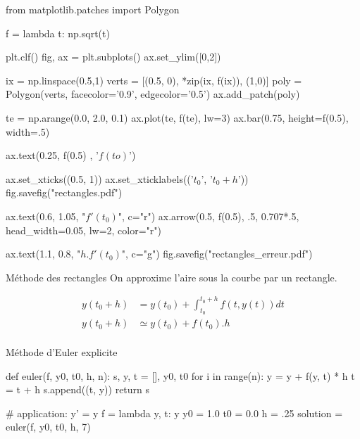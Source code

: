 \documentclass{beamer}
\begin{document}
\begin{pycode}
    from matplotlib.patches import Polygon

    f = lambda t: np.sqrt(t)

    plt.clf()
    fig, ax = plt.subplots()
    ax.set_ylim([0,2])

    ix = np.linspace(0.5,1)
    verts = [(0.5, 0), *zip(ix, f(ix)), (1,0)]
    poly = Polygon(verts, facecolor='0.9', edgecolor='0.5')
    ax.add_patch(poly)

    te = np.arange(0.0, 2.0, 0.1)
    ax.plot(te, f(te), lw=3)
    ax.bar(0.75, height=f(0.5), width=.5)

    ax.text(0.25, f(0.5) , '$f(to)$')

    ax.set_xticks((0.5, 1))
    ax.set_xticklabels(('$t_0$', '$t_0+h$'))
    fig.savefig("rectangles.pdf")

    ax.text(0.6, 1.05, "$f'(t_0)$", c="r")
    ax.arrow(0.5, f(0.5), .5, 0.707*.5, head_width=0.05, lw=2, color="r")

    ax.text(1.1, 0.8, "$h.f'(t_0)$", c="g")
    fig.savefig("rectangles_erreur.pdf")
\end{pycode}

\begin{frame}{Méthode des rectangles}
    On approxime l'aire sous la courbe par un rectangle.
    \vspace{-.25cm}
    \begin{figure}
    \end{figure}
    \vspace{-.5cm}
    \begin{align*}
        y(t_0+h) & =  y(t_0) + \int_{t_0}^{t_0+h} f(t,y(t)) dt \\
        y(t_0+h) & \simeq  y(t_0) + f(t_0).h                   \\
    \end{align*}
\end{frame}

\begin{frame}[fragile]{Méthode d'Euler explicite}
    \begin{pyblock}
    def euler(f, y0, t0, h, n):
        s, y, t = [], y0, t0
        for i in range(n):
            y = y + f(y, t) * h
            t = t + h
            s.append((t, y))
        return s

    # application: y' = y
    f = lambda y, t: y 
    y0 = 1.0
    t0 = 0.0
    h = .25
    solution = euler(f, y0, t0, h, 7)
    \end{pyblock}
\end{frame}
\end{document}
